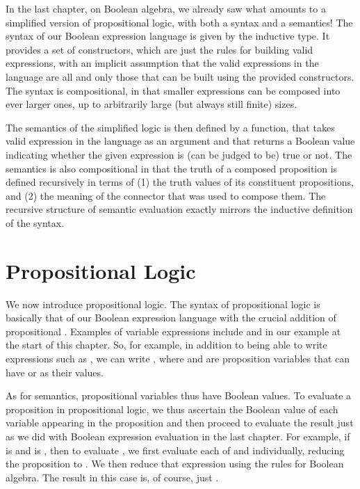 \documentclass[letterpaper,10pt,english]{sphinxmanual}
\begin{document}
In the last chapter, on Boolean algebra, we already saw what amounts
to a simplified version of propositional logic, with both a syntax and
a semantics! The syntax of our Boolean expression language is given by
the inductive  type.  It provides a set of constructors, which
are just the rules for building valid expressions, with an implicit
assumption that the valid expressions in the language are all and only
those that can be built using the provided constructors. The syntax is
compositional, in that smaller expressions can be composed into ever
larger ones, up to arbitrarily large (but always still finite) sizes.

The semantics of the simplified logic is then defined by a  function, that takes  valid expression in the
language as an argument and that returns a Boolean value indicating
whether the given expression is (can be judged to be) true or not.
The semantics is also compositional in that the truth of a composed
proposition is defined recursively in terms of (1) the truth values of
its constituent propositions, and (2) the meaning of the connector
that was used to compose them. The recursive structure of semantic
evaluation exactly mirrors the inductive definition of the syntax.


\section{Propositional Logic}
\label{\detokenize{11-propositional-logic:id1}}
We now introduce propositional logic. The syntax of propositional
logic is basically that of our Boolean expression language with the
crucial addition of propositional . Examples of
variable expressions include  and  in our example at the start
of this chapter. So, for example, in addition to being able to write
expressions such as , we can write ,
where  and  are proposition variables that can have  or
 as their values.

As for semantics, propositional variables thus have Boolean values. To
evaluate a proposition in propositional logic, we thus ascertain the
Boolean value of each variable appearing in the proposition and then
proceed to evaluate the result just as we did with Boolean expression
evaluation in the last chapter. For example, if  is  and 
is , then to evaluate , we first evaluate each of 
and  individually, reducing the proposition to . We
then reduce that expression using the rules for Boolean algebra. The
result in this case is, of course, just .
\end{document}
